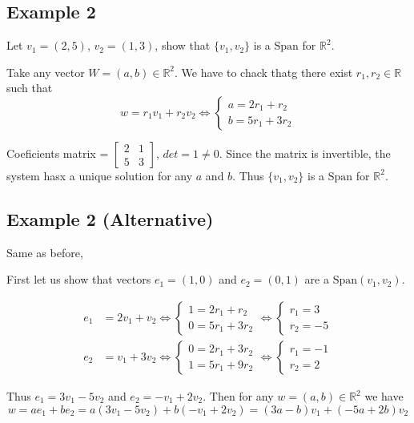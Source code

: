 \documentclass[10pt, oneside]{article}
\newcommand{\R}{\mathbb{R}}
\begin{document}
\subsection{Example 2}

Let $v_1 = (2,5)$, $v_2 = (1,3)$, show that $\{v_1, v_2\}$ is a $\text{Span}$ for $\R^2$.

Take any vector $W = (a,b) \in \R^2$. We have to chack thatg there exist $r_1, r_2 \in \R$ such that
\[
	w = r_1v_1 + r_2v_2 \iff \begin{cases} a = 2r_1 + r_2 \\ b = 5r_1 + 3r_2 \end{cases}
\]

Coeficients matrix = $\begin{bmatrix} 2 & 1 \\ 5 & 3 \end{bmatrix}$, $det = 1 \neq 0$. Since the matrix
is invertible, the system hasx a unique solution for any $a$ and $b$. Thus $\{v_1, v_2\}$ is a $\text{Span}$ for $\R^2$.

\subsection{Example 2 (Alternative)}
Same as before,

First let us show that vectors $e_1 = (1,0)$ and $e_2 = (0,1)$ are a $\text{Span}(v_1, v_2)$.

\[
	\begin{split}
		e_1 &= 2v_1 + v_2 \iff \begin{cases} 1 = 2 r_1 + r_2 \\ 0 = 5r_1 + 3r_2 \end{cases}
		\iff \begin{cases} r_1 = 3 \\ r_2 = -5 \end{cases} \\
		e_2 &= v_1 + 3v_2 \iff \begin{cases} 0 = 2r_1 + 3r_2 \\ 1 = 5r_1 + 9r_2 \end{cases}
		\iff \begin{cases} r_1 = -1 \\ r_2 = 2 \end{cases}
	\end{split}
\]

Thus $e_1 = 3v_1 - 5v_2$ and $e_2 = -v_1 + 2v_2$. Then for any $w = (a,b) \in \R^2$ we have
\[
	w = ae_1 + be_2 = a(3v_1 - 5v_2) + b(-v_1 + 2v_2) = (3a - b)v_1 + (-5a + 2b)v_2
\]
\end{document}
